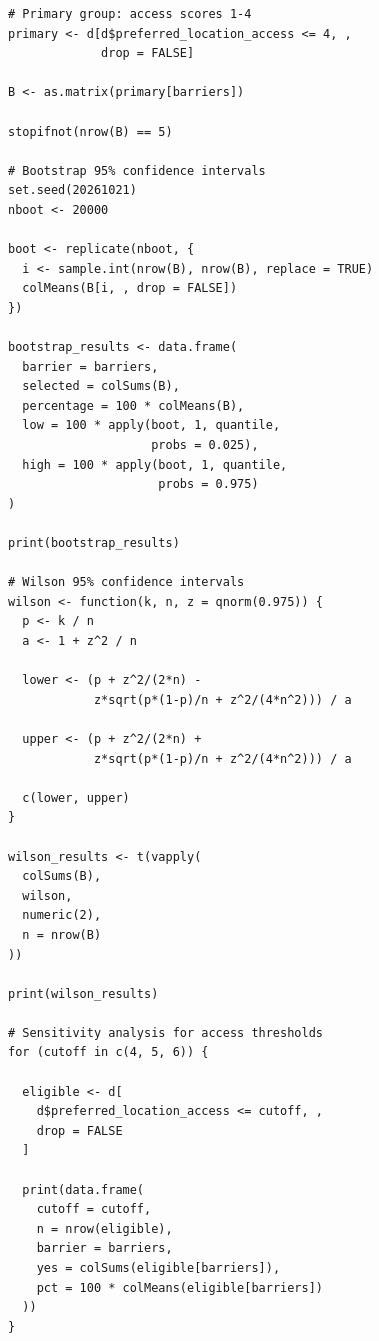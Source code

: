 \documentclass[11pt,letterpaper]{article}
\begin{document}
\begin{lstlisting}[style=rsource]
# Primary group: access scores 1-4
primary <- d[d$preferred_location_access <= 4, ,
             drop = FALSE]

B <- as.matrix(primary[barriers])

stopifnot(nrow(B) == 5)

# Bootstrap 95% confidence intervals
set.seed(20261021)
nboot <- 20000

boot <- replicate(nboot, {
  i <- sample.int(nrow(B), nrow(B), replace = TRUE)
  colMeans(B[i, , drop = FALSE])
})

bootstrap_results <- data.frame(
  barrier = barriers,
  selected = colSums(B),
  percentage = 100 * colMeans(B),
  low = 100 * apply(boot, 1, quantile,
                    probs = 0.025),
  high = 100 * apply(boot, 1, quantile,
                     probs = 0.975)
)

print(bootstrap_results)

# Wilson 95% confidence intervals
wilson <- function(k, n, z = qnorm(0.975)) {
  p <- k / n
  a <- 1 + z^2 / n

  lower <- (p + z^2/(2*n) -
            z*sqrt(p*(1-p)/n + z^2/(4*n^2))) / a

  upper <- (p + z^2/(2*n) +
            z*sqrt(p*(1-p)/n + z^2/(4*n^2))) / a

  c(lower, upper)
}

wilson_results <- t(vapply(
  colSums(B),
  wilson,
  numeric(2),
  n = nrow(B)
))

print(wilson_results)

# Sensitivity analysis for access thresholds
for (cutoff in c(4, 5, 6)) {

  eligible <- d[
    d$preferred_location_access <= cutoff, ,
    drop = FALSE
  ]

  print(data.frame(
    cutoff = cutoff,
    n = nrow(eligible),
    barrier = barriers,
    yes = colSums(eligible[barriers]),
    pct = 100 * colMeans(eligible[barriers])
  ))
}

\end{lstlisting}
\end{document}
